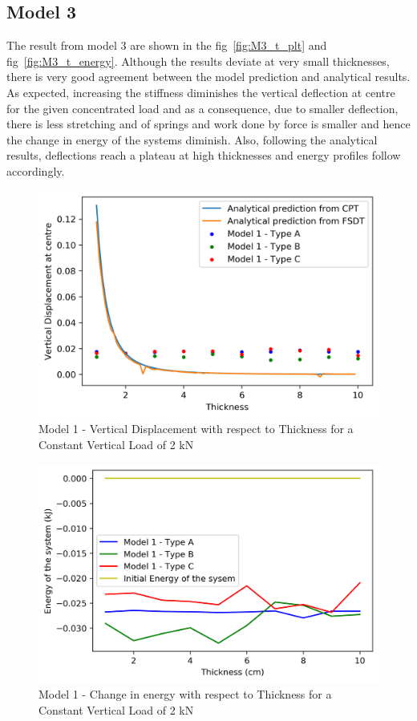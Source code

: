   \subsection{Model 3}
 The result from model 3 are shown in the fig~\ref{fig:M3_t_plt} and fig~\ref{fig:M3_t_energy}. Although the results deviate at very small thicknesses, there is very good agreement between the model prediction and analytical results. As expected, increasing the stiffness diminishes the vertical deflection at centre for the given concentrated load and as a consequence, due to smaller deflection, there is less stretching and of springs and work done by force is smaller and hence the change in energy of the systems diminish. Also, following the analytical results, deflections reach a plateau at high thicknesses and energy profiles follow accordingly.
 
 \begin{figure}[!htbp]
     \centering
     \includegraphics{Figures/M1_t_plt.png}
     \caption{Model 1 - Vertical Displacement with respect to Thickness for a Constant Vertical Load of 2 kN}
     \label{fig:M1_t_plt}
 \end{figure}
 
 \begin{figure}[!htbp]
     \centering
     \includegraphics{Figures/M1_t_energy.png}
     \caption{Model 1 - Change in energy with respect to Thickness for a Constant Vertical Load of 2 kN}
     \label{fig:M1_t_energy}
 \end{figure}
 

